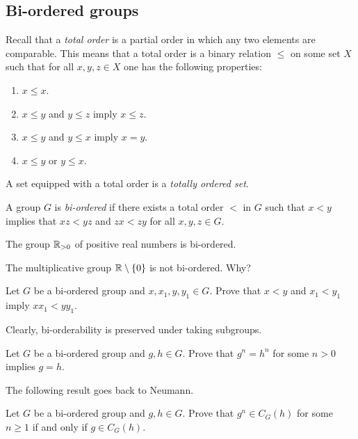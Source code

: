 \begin{graybox}
\project
\section{Bi-ordered groups}


Recall that a \emph{total order} is a partial order in which any two elements are comparable. This
means that a total order is a binary relation $\leq$ on some set $X$ 
such that for all $x,y,z\in X$ one has 
the following properties: 
\begin{enumerate}
    \item $x\leq x$.
    \item $x\leq y$ and $y\leq z$ imply $x\leq z$.
    \item $x\leq y$ and $y\leq x$ imply $x=y$.
    \item $x\leq y$ or $y\leq x$. 
\end{enumerate}
A set equipped with a total order is a \emph{totally ordered set}. 

\begin{definition}
	A group $G$ is \emph{bi-ordered} if there exists a total order 
	$<$ in $G$
	such that $x<y$ implies that $xz<yz$ and $zx<zy$ for all $x,y,z\in G$.
\end{definition}

\begin{example}
	The group $\mathbb{R}_{>0}$ of positive real numbers is bi-ordered. 
\end{example}

The multiplicative group $\mathbb{R}\setminus\{0\}$ is not bi-ordered. Why?

\begin{xca}
	Let $G$ be a bi-ordered group and $x,x_1,y,y_1\in G$. Prove that
	$x<y$ and $x_1<y_1$ imply $xx_1<yy_1$.
\end{xca}

Clearly, bi-orderability is preserved under taking subgroups. 

\begin{xca}
	Let $G$ be a bi-ordered group and $g,h\in G$. Prove that $g^n=h^n$
	for some $n>0$ implies $g=h$.
\end{xca}

The following result goes back to Neumann.

\begin{xca}
    Let $G$ be a bi-ordered group and $g,h\in G$. Prove that $g^n\in C_G(h)$ for some $n\geq1$ if 
    and only if $g\in C_G(h)$.
\end{xca}


\end{graybox}
